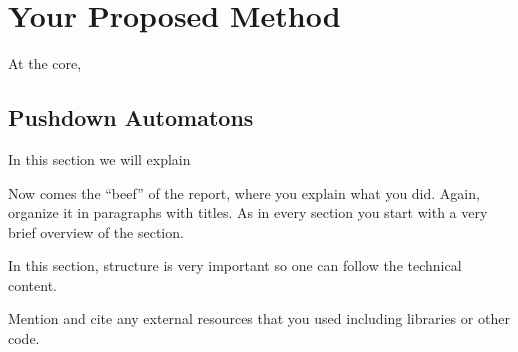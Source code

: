 \section{Your Proposed Method}\label{sec:yourmethod}

At the core, 

\subsection{Pushdown Automatons}

In this section we will explain 

Now comes the ``beef'' of the report, where you explain what you
did. Again, organize it in paragraphs with titles. As in every section
you start with a very brief overview of the section.

In this section, structure is very important so one can follow the technical content.

Mention and cite any external resources that you used including libraries or other code.
